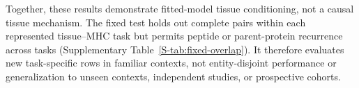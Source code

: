 Together, these results demonstrate fitted-model tissue conditioning, not a causal tissue mechanism. The fixed test holds out complete pairs within each represented tissue--MHC task but permits peptide or parent-protein recurrence across tasks (Supplementary Table~\ref{S-tab:fixed-overlap}). It therefore evaluates new task-specific rows in familiar contexts, not entity-disjoint performance or generalization to unseen contexts, independent studies, or prospective cohorts.

